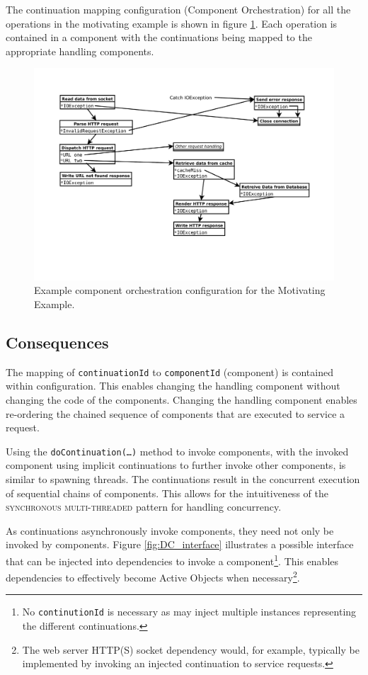 \documentclass[prodmode]{style/acmlarge}
\begin{document}
The continuation mapping configuration (Component Orchestration) for all the
operations in the motivating example is shown in figure
\ref{fig:ExampleComponentOrchestration}.  Each operation is contained in a
component with the continuations being mapped to the appropriate handling
components.
 
\begin{figure}[!t]
\centering
\includegraphics[width=4.5in]{ContinuationInjectionComponentOrchestration}
\caption{Example component orchestration configuration for the Motivating Example.}
\label{fig:ExampleComponentOrchestration}
\end{figure}


\subsection{Consequences}

The mapping of \texttt{continuationId} to \texttt{componentId} (component) is
contained within configuration.  This enables changing the handling component
without changing the code of the components.  Changing the handling component
enables re-ordering the chained sequence of components that are executed to
service a request.

Using the \texttt{doContinuation(\ldots)} method to invoke components, with the
invoked component using implicit continuations to further invoke other
components, is similar to spawning threads.  The continuations result in the
concurrent execution of sequential chains of components.  This allows for the
intuitiveness of the \textsc{synchronous multi-threaded} pattern \cite{proactor}
for handling concurrency.

As continuations asynchronously invoke components, they need not only be invoked
by components. Figure \ref{fig:DC_interface} illustrates a possible interface
that can be injected into dependencies to invoke a component\footnote{No
\texttt{continutionId} is necessary as may inject multiple instances
representing the different continuations.}.  This enables dependencies to
effectively become Active Objects \cite{active-object} when
necessary\footnote{The web server HTTP(S) socket dependency would, for example,
typically be implemented by invoking an injected continuation to service
requests.}.
\end{document}
